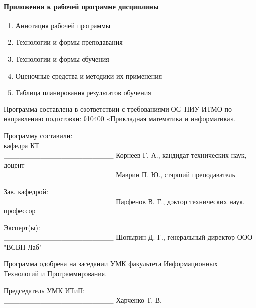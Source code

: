 \paragraph{Приложения к рабочей программе дисциплины}
{
\begin{enumerate}
\item Аннотация рабочей программы
\item Технологии и формы преподавания 
\item Технологии и формы обучения 
\item Оценочные средства и методики их применения
\item Таблица планирования результатов обучения
\end{enumerate}
}

\vspace{1cm}

Программа составлена в соответствии с требованиями ОС НИУ ИТМО по направлению подготовки: 010400 «Прикладная математика и информатика».

\vspace{1cm}

{\parindent0pt
Программу составили:\\
кафедра КТ\\ \_\_\_\_\_\_\_\_\_\_\_\_\_\_\_\_\_\_\_\_\_ Корнеев Г. А., кандидат технических наук, доцент\\ \_\_\_\_\_\_\_\_\_\_\_\_\_\_\_\_\_\_\_\_\_ Маврин П. Ю., старший преподаватель

\vspace{1cm}

Зав. кафедрой:\\
\_\_\_\_\_\_\_\_\_\_\_\_\_\_\_\_\_\_\_\_\_ Парфенов В. Г., доктор технических наук, профессор

\vspace{1cm}

Эксперт(ы):\\ \_\_\_\_\_\_\_\_\_\_\_\_\_\_\_\_\_\_\_\_\_ Шопырин Д. Г., генеральный директор ООО "ВСВН Лаб"

\vfill

Программа одобрена на заседании УМК факультета Информационных Технологий и Программирования.

\vspace{1cm}

Председатель УМК ИТиП:\\
\_\_\_\_\_\_\_\_\_\_\_\_\_\_\_\_\_\_\_\_\_ Харченко Т. В.
}

